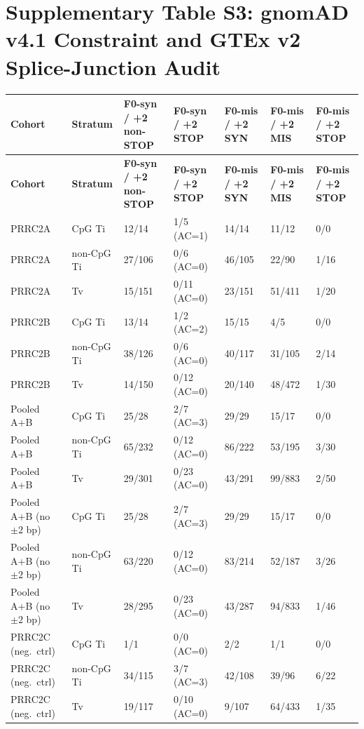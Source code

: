 \documentclass[10pt,letterpaper]{article}
\begin{document}
\section*{Supplementary Table S3: gnomAD v4.1 Constraint and GTEx v2 Splice-Junction Audit}
\vspace{3pt}
{\scriptsize\setlength{\tabcolsep}{3.5pt}\renewcommand{\arraystretch}{1.08}
\begin{longtable}{@{}lllllll@{}}
\toprule
\textbf{Cohort} & \textbf{Stratum} & \textbf{F0-syn / +2 non-STOP} & \textbf{F0-syn / +2 STOP} & \textbf{F0-mis / +2 SYN} & \textbf{F0-mis / +2 MIS} & \textbf{F0-mis / +2 STOP} \\
\midrule
\endfirsthead
\toprule
\textbf{Cohort} & \textbf{Stratum} & \textbf{F0-syn / +2 non-STOP} & \textbf{F0-syn / +2 STOP} & \textbf{F0-mis / +2 SYN} & \textbf{F0-mis / +2 MIS} & \textbf{F0-mis / +2 STOP} \\
\midrule
\endhead
\bottomrule
\endfoot
PRRC2A & CpG Ti & 12/14 & 1/5 (AC=1) & 14/14 & 11/12 & 0/0 \\
PRRC2A & non-CpG Ti & 27/106 & 0/6 (AC=0) & 46/105 & 22/90 & 1/16 \\
PRRC2A & Tv & 15/151 & 0/11 (AC=0) & 23/151 & 51/411 & 1/20 \\
PRRC2B & CpG Ti & 13/14 & 1/2 (AC=2) & 15/15 & 4/5 & 0/0 \\
PRRC2B & non-CpG Ti & 38/126 & 0/6 (AC=0) & 40/117 & 31/105 & 2/14 \\
PRRC2B & Tv & 14/150 & 0/12 (AC=0) & 20/140 & 48/472 & 1/30 \\
Pooled A+B & CpG Ti & 25/28 & 2/7 (AC=3) & 29/29 & 15/17 & 0/0 \\
Pooled A+B & non-CpG Ti & 65/232 & 0/12 (AC=0) & 86/222 & 53/195 & 3/30 \\
Pooled A+B & Tv & 29/301 & 0/23 (AC=0) & 43/291 & 99/883 & 2/50 \\
Pooled A+B (no $\pm 2$ bp) & CpG Ti & 25/28 & 2/7 (AC=3) & 29/29 & 15/17 & 0/0 \\
Pooled A+B (no $\pm 2$ bp) & non-CpG Ti & 63/220 & 0/12 (AC=0) & 83/214 & 52/187 & 3/26 \\
Pooled A+B (no $\pm 2$ bp) & Tv & 28/295 & 0/23 (AC=0) & 43/287 & 94/833 & 1/46 \\
PRRC2C (neg.\ ctrl) & CpG Ti & 1/1 & 0/0 (AC=0) & 2/2 & 1/1 & 0/0 \\
PRRC2C (neg.\ ctrl) & non-CpG Ti & 34/115 & 3/7 (AC=3) & 42/108 & 39/96 & 6/22 \\
PRRC2C (neg.\ ctrl) & Tv & 19/117 & 0/10 (AC=0) & 9/107 & 64/433 & 1/35 \\
\end{longtable}
}
\end{document}
